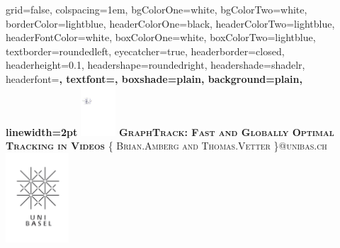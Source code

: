 \documentclass[landscape,final,fontscale=0.225,paperwidth=67.5in,paperheight=45in]{baposter}
\begin{document}
\begin{poster}%
  {
  grid=false,
  colspacing=1em,
  bgColorOne=white,
  bgColorTwo=white,
  borderColor=lightblue,
  headerColorOne=black,
  headerColorTwo=lightblue,
  headerFontColor=white,
  boxColorOne=white,
  boxColorTwo=lightblue,
  textborder=roundedleft,
  eyecatcher=true,
  headerborder=closed,
  headerheight=0.1\textheight,
  headershape=roundedright,
  headershade=shadelr,
  headerfont=\Large\bf\textsc, %
  textfont={\setlength{\parindent}{1.5em}},
  boxshade=plain,
  background=plain,
  linewidth=2pt
  }
  {\includegraphics[height=5em]{images/graph_occluded.pdf}} 
  {\bf\textsc{GraphTrack: Fast and Globally Optimal Tracking in Videos}\vspace{0.5em}}
  {\textsc{\{ Brian.Amberg and Thomas.Vetter \}@unibas.ch}}
  {%
    \includegraphics[height=9.0em]{images/logo}
  }

    \newcommand{\colouredcircle}{%
      \tikz{\useasboundingbox (-0.2em,-0.32em) rectangle(0.2em,0.32em); \draw[draw=black,fill=lightblue,line width=0.03em] (0,0) circle(0.18em);}}


\end{poster}
\end{document}
